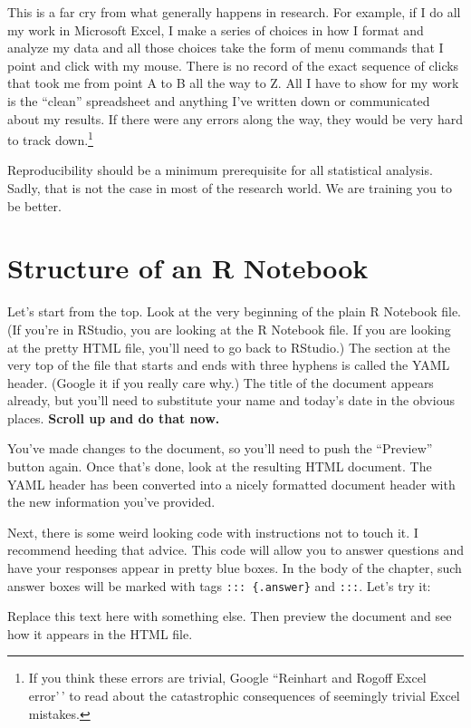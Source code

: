 \documentclass[
]{book}
\begin{document}
This is a far cry from what generally happens in research. For example, if I do all my work in Microsoft Excel, I make a series of choices in how I format and analyze my data and all those choices take the form of menu commands that I point and click with my mouse. There is no record of the exact sequence of clicks that took me from point A to B all the way to Z. All I have to show for my work is the ``clean'' spreadsheet and anything I've written down or communicated about my results. If there were any errors along the way, they would be very hard to track down.\footnote{If you think these errors are trivial, Google ``Reinhart and Rogoff Excel error'\,' to read about the catastrophic consequences of seemingly trivial Excel mistakes.}

Reproducibility should be a minimum prerequisite for all statistical analysis. Sadly, that is not the case in most of the research world. We are training you to be better.

\hypertarget{rmark-structure}{%
\section{Structure of an R Notebook}\label{rmark-structure}}

Let's start from the top. Look at the very beginning of the plain R Notebook file. (If you're in RStudio, you are looking at the R Notebook file. If you are looking at the pretty HTML file, you'll need to go back to RStudio.) The section at the very top of the file that starts and ends with three hyphens is called the YAML header. (Google it if you really care why.) The title of the document appears already, but you'll need to substitute your name and today's date in the obvious places. \textbf{Scroll up and do that now.}

You've made changes to the document, so you'll need to push the ``Preview'' button again. Once that's done, look at the resulting HTML document. The YAML header has been converted into a nicely formatted document header with the new information you've provided.

Next, there is some weird looking code with instructions not to touch it. I recommend heeding that advice. This code will allow you to answer questions and have your responses appear in pretty blue boxes. In the body of the chapter, such answer boxes will be marked with tags \texttt{:::\ \{.answer\}} and \texttt{:::}. Let's try it:

Replace this text here with something else. Then preview the document and see how it appears in the HTML file.
\end{document}
